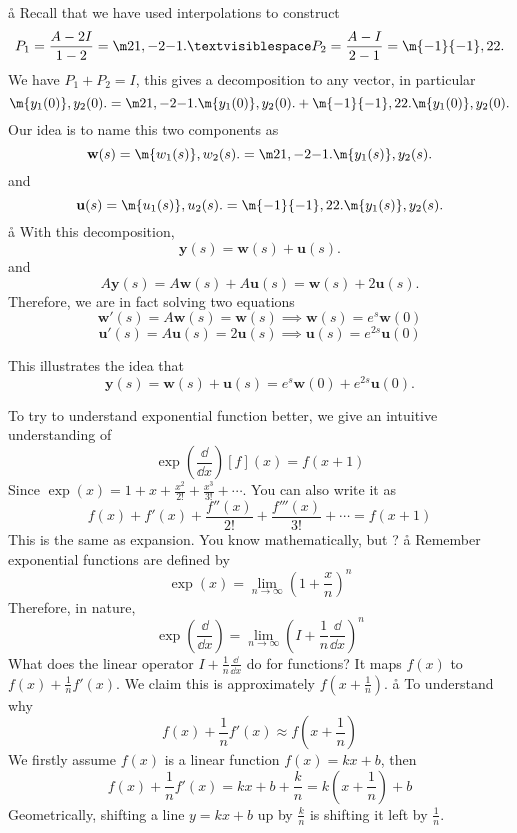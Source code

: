 
\a\aa
Recall that we have used interpolations to construct 
$$
P_1 = \frac{A-2I}{1-2}=\m21,{-2}{-1}. ␣ 
P_2 = \frac{A-I}{2-1} = \m {-1}{-1},22.
$$
We have $P_1+P_2=I$, this gives a decomposition to any vector, in particular
$$
\m
{y_1(0)},
{y_2(0)}.
=
\m21,{-2}{-1}.\m
{y_1(0)},
{y_2(0)}.
+
\m {-1}{-1},22.
\m
{y_1(0)},
{y_2(0)}.
$$
Our idea is to name this two components as
$$
\textbf{w}(s)=\m
{w_1(s)},
{w_2(s)}.
=
\m21,{-2}{-1}.\m
{y_1(s)},
{y_2(s)}.
$$
and
$$
\textbf{u}(s)=\m
{u_1(s)},
{u_2(s)}.
=
\m {-1}{-1},22.\m
{y_1(s)},
{y_2(s)}.
$$
\a\aa
With this decomposition, 
$$
\mathbf y(s)=\mathbf w(s)+\mathbf u(s).
$$
and
$$
A\mathbf y(s)=A\mathbf w(s)+A\mathbf u(s) = \mathbf w(s)+2\mathbf u(s).
$$
Therefore, we are in fact solving two equations
$$ \mathbf w'(s) = A\mathbf w(s) = \mathbf w(s)  ⟹   \mathbf w(s) = e^s\mathbf w(0) $$
$$ \mathbf u'(s) = A\mathbf u(s) = 2\mathbf u(s)  ⟹   \mathbf u(s) = e^{2s}\mathbf u(0) $$

This illustrates the idea that
$$
\mathbf y(s) = \mathbf w(s)+\mathbf u(s) = e^s\mathbf w(0) + e^{2s}\mathbf u(0).
$$

\aaa

To try to understand exponential function better, we give an intuitive understanding of 
$$
\exp\left(\frac{\dd}{\dd x}\right)[f](x)=f(x+1)
$$
Since $\exp(x)=1+x+\frac{x^2}{2!}+\frac{x^3}{3!}+\cdots$. You can also write it as 
$$
f(x)+f'(x)+\frac{f''(x)}{2!}+\frac{f'''(x)}{3!}+\cdots = f(x+1)
$$
This is the same as  expansion. You know mathematically, but ?
\a\aa
Remember exponential functions are defined by
$$
\exp(x)=\lim_{n\rightarrow \infty}\left(1+\frac xn\right)^n
$$
Therefore, in nature, 
$$
\exp\left(\frac{\dd}{\dd x}\right)=\lim_{n\rightarrow \infty}\left(I+\frac1n\frac{\dd}{\dd x}\right)^n
$$
\vfill
What does the linear operator $I+\frac1n\frac{\dd}{\dd x}$ do for functions? 
\vfill
It maps $f(x)$ to $f(x)+\frac1n f'(x)$. We claim this is approximately $f\left(x+\frac1n\right)$. 
\a\aa
To understand why 
$$
f(x)+\frac1n f'(x)\approx f\left(x+\frac1n\right)
$$
We firstly assume $f(x)$ is a linear function $f(x)=kx+b$, then
$$
f(x)+\frac1n f'(x)=kx+b+\frac kn=k(x+\frac1n)+b
$$
Geometrically, shifting a line $y=kx+b$ up by $\frac kn$ is shifting it left by $\frac1n$.

